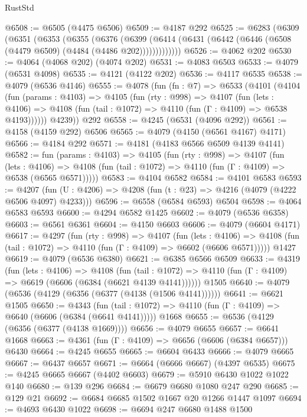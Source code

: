 \begin{lexlean}{RustStd}
\begin{coremodule}
@6508 := @6505 (@4475 @6506)
@6509 := @4187 @292
@6525 := @6283
    (@6309
      (@6351
        (@6353
          (@6355
            (@6376
              (@6399
                (@6414 (@6431 (@6442 (@6446 (@6508 (@4479 @6509) (@4484 (@4486 @202)))))))))))))
@6526 := @4062 @202
@6530 := @4064 (@4068 @202) (@4074 @202)
@6531 := @4083 @6503
@6533 := @4079 (@6531 @4098)
@6535 := @4121 (@4122 @202)
@6536 := @4117 @6535
@6538 := @4079 (@6536 @4146)
@6555 := @4078
    (fun (fn : @7) =>
    @6533
      (@4101
        (@4104
          (fun (params : @4103) =>
          @4105
            (fun (rty : @998) =>
            @4107
              (fun (lets : @4106) =>
              @4108 (fun (tail : @1072) => @4110 (fun (Γ : @4109) => @6538 @4193))))))
        @4239))
    @292
@6558 := @4245 (@6531 (@4096 @292))
@6561 := @4158 (@4159 @292) @6506
@6565 := @4079 (@4150 (@6561 @4167) @4171)
@6566 := @4184 @292
@6571 := @4181 (@4183 @6566 @6509 @4139 @4141)
@6582 := fun (params : @4103) =>
  @4105
    (fun (rty : @998) =>
    @4107
      (fun (lets : @4106) =>
      @4108 (fun (tail : @1072) => @4110 (fun (Γ : @4109) => @6538 (@6565 @6571)))))
@6583 := @4104 @6582
@6584 := @4101 @6583
@6593 := @4207 (fun (U : @4206) => @4208 (fun (t : @23) => @4216 (@4079 (@4222 @6506 @4097) @4233)))
@6596 := @6558 (@6584 @6593) @6504
@6598 := @4064 @6583 @6593
@6600 := @4294 @6582 @1425
@6602 := @4079 (@6536 @6358)
@6603 := @6561 @6361
@6604 := @4150 @6603
@6606 := @4079 (@6604 @4171)
@6617 := @4297
    (fun (rty : @998) =>
    @4107
      (fun (lets : @4106) =>
      @4108 (fun (tail : @1072) => @4110 (fun (Γ : @4109) => @6602 (@6606 @6571)))))
    @1427
@6619 := @4079 (@6536 @6380)
@6621 := @6385 @6566 @6509
@6633 := @4319
    (fun (lets : @4106) =>
    @4108
      (fun (tail : @1072) => @4110 (fun (Γ : @4109) => @6619 (@6606 (@6384 (@6621 @4139 @4141))))))
    @1505
@6640 := @4079 (@6536 (@4129 (@6356 (@6377 (@4138 (@1506 @4141))))))
@6641 := @6621 @1505
@6650 := @4343
    (fun (tail : @1072) => @4110 (fun (Γ : @4109) => @6640 (@6606 (@6384 (@6641 @4141)))))
    @1668
@6655 := @6536 (@4129 (@6356 (@6377 (@4138 @1669))))
@6656 := @4079 @6655
@6657 := @6641 @1668
@6663 := @4361 (fun (Γ : @4109) => @6656 (@6606 (@6384 @6657))) @6430
@6664 := @4245 @6655
@6665 := @6604 @6433
@6666 := @4079 @6665
@6667 := @6437 @6657
@6671 := @6664 (@6666 @6667) (@4397 @6535)
@6675 := @4245 @6665 @6667 (@4402 @6603)
@6679 := @5910 @6430 @1022 @1022 @140
@6680 := @139 @296
@6684 := @6679 @6680 @1080 @247 @290
@6685 := @129 @21
@6692 := @6684 @6685 @1502 @1667 @20 @1266 @1447 @1097
@6694 := @4693 @6430 @1022
@6698 := @6694 @247 @6680 @1488 @1500

\end{coremodule}
\end{lexlean}
